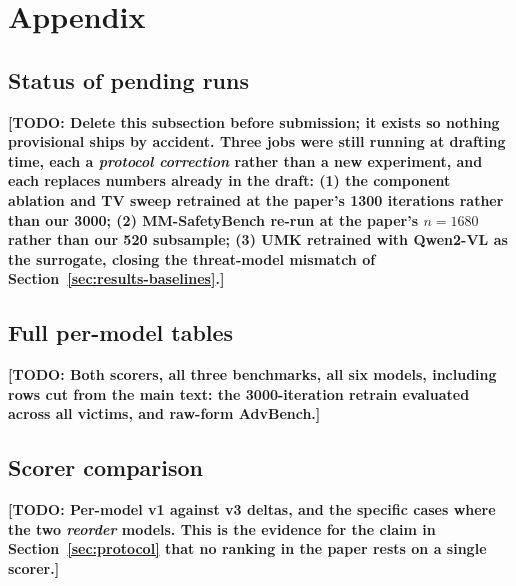 \documentclass[10pt]{article} %
\newcommand{\todo}[1]{\textbf{[TODO: #1]}}
\begin{document}




\appendix
\section{Appendix}

\subsection{Status of pending runs}
\label{sec:pending}

\todo{Delete this subsection before submission; it exists so nothing provisional ships by accident. Three jobs were still running at drafting time, each a \emph{protocol correction} rather than a new experiment, and each replaces numbers already in the draft: (1) the component ablation and TV sweep retrained at the paper's 1300 iterations rather than our 3000; (2) MM-SafetyBench re-run at the paper's $n=1680$ rather than our 520 subsample; (3) UMK retrained with Qwen2-VL as the surrogate, closing the threat-model mismatch of Section~\ref{sec:results-baselines}.}

\subsection{Full per-model tables}

\todo{Both scorers, all three benchmarks, all six models, including rows cut from the main text: the 3000-iteration retrain evaluated across all victims, and raw-form AdvBench.}

\subsection{Scorer comparison}

\todo{Per-model v1 against v3 deltas, and the specific cases where the two \emph{reorder} models. This is the evidence for the claim in Section~\ref{sec:protocol} that no ranking in the paper rests on a single scorer.}
\end{document}
